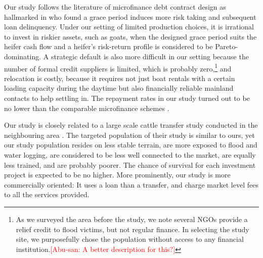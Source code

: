 	Our study follows the literature of microfinance debt contract design as hallmarked in \citet{Field2013} who found a grace period induces more risk taking and subsequent loan delinquency. Under our setting of limited production choices, it is irrational to invest in riskier assets, such as goats, when the designed grace period suits the heifer cash flow and a heifer's risk-return profile is considered to be Pareto-dominating. A strategic default is also more difficult in our setting because the number of formal credit suppliers is limited, which is probably zero,\footnote{As we surveyed the area before the study, we note several NGOs provide a relief credit to flood victims, but not regular finance. In selecting the study site, we purposefully chose the population without access to any financial institution.\textcolor{red}{[Abu-san: A better description for this?]} } and relocation is costly, because it requires not just boat rentals with a certain loading capacity during the daytime but also financially reliable mainland contacts to help settling in. The repayment rates in our study turned out to be no lower than the comparable microfinance schemes \citep{BanerjeeKarlanZinman2015}.

	Our study is closely related to a large scale cattle transfer study conducted in the neighbouring area \citep{BandieraBRAC2017, Balboni2020}. The targeted population of their study is similar to ours, yet our study population resides on less stable terrain, are more exposed to flood and water logging, are considered to be less well connected to the market, are equally less trained, and are probably poorer. The chance of survival for each investment project is expected to be no higher. More prominently, our study is more commercially oriented: It uses a loan than a transfer, and charge market level fees to all the services provided. 


	
